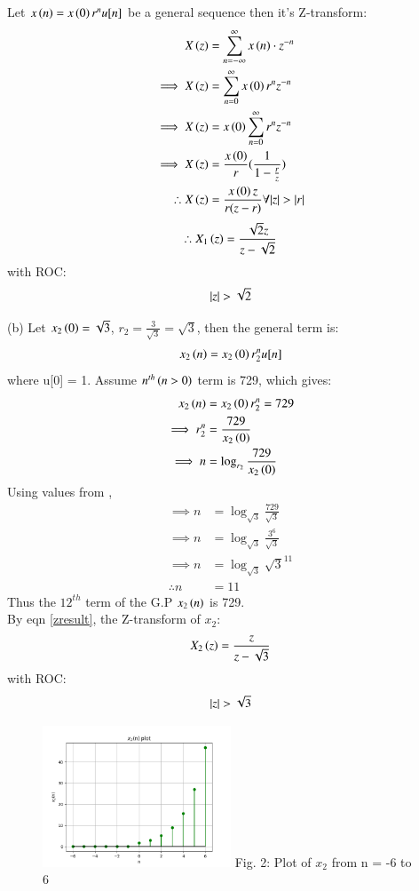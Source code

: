 \documentclass[journal,12pt,twocolumn]{IEEEtran}
\theoremstyle{remark}
\begin{document}
Let $x\left(n\right) = x\left(0\right)r^nu[n]$ be a general sequence then it's Z-transform:
\begin{align}
    X\left(z\right) &= \sum_{n = -\infty}^{\infty}{x\left(n\right) \cdot z^{-n}}\\
    \implies X\left(z\right) &= \sum_{n = 0}^{\infty}{x\left(0\right)r^{n}z^{-n}}\\
    \implies X\left(z\right) &= x\left(0\right)\sum_{n = 0}^{\infty}{r^n z^{-n}}\\
    \implies X\left(z\right) &= \frac{x\left(0\right)}{r}(\frac{1}{1 - \frac{r}{z}})\\
    \therefore X\left(z\right) &= \frac{x\left(0\right)z}{r(z - r)} \forall {\left\vert z\right\vert > \left\vert r\right\vert} \label{zresult}
\end{align}
\begin{align}
    \therefore X_1\left(z\right) = \frac{\sqrt{2}z}{z - \sqrt{2}}
\end{align}
with ROC: \[ \left\vert z\right\vert > \sqrt{2} \]

(b) Let $x_2\left(0\right) = \sqrt{3}$, $r_2 = \frac{3}{\sqrt{3}} = \sqrt{3}$, then the general term is:
\begin{align}
    x_2\left(n\right) = x_2\left(0\right) r_2^nu[n]
\end{align}
where u[0] = 1. Assume $n^{th}\left(n > 0\right)$ term is 729, which gives: 
\begin{align}
    x_2\left(n\right) &= x_2\left(0\right) r_2^n = 729\\
    \implies r_2^n &= \frac{729}{x_2\left(0\right)}\\
    \implies n &= \log_{r_2}{\frac{729}{x_2\left(0\right)}}
\end{align}
Using values from ,
\begin{align}
    \implies n &= \log_{\sqrt{3}}{\frac{729}{\sqrt{3}}}\\
    \implies n &= \log_{\sqrt{3}}{\frac{3^6}{\sqrt{3}}}\\
    \implies n &= \log_{\sqrt{3}}{\sqrt{3}^{11}}\\
    \therefore n &= 11
\end{align}
Thus the $12^{th}$ term of the G.P $x_2\left(n\right)$ is 729. \\

By eqn \ref{zresult}, the Z-transform of $x_2$:
\begin{align} X_2\left(z\right) = \frac{z}{z - \sqrt{3}} \end{align}
with ROC: \[ \left\vert z\right\vert > \sqrt{3} \]

\begin{figure}[h!]
    \centering
    \includegraphics[width=0.5\textwidth]{figs/b.png}
    Fig. 2: Plot of $x_2$ from n = -6 to 6
    \label{fig:img2}
\end{figure}
\end{document}
